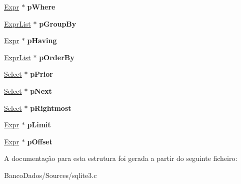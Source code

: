 \begin{DoxyCompactItemize}
\item 
\hypertarget{struct_select_a0562c1e19acde263a04af015611d8ce8}{\hyperlink{struct_expr}{Expr} $\ast$ {\bfseries p\-Where}}\label{struct_select_a0562c1e19acde263a04af015611d8ce8}

\item 
\hypertarget{struct_select_a5b625c7495468ae56ca2f214a76231a0}{\hyperlink{struct_expr_list}{Expr\-List} $\ast$ {\bfseries p\-Group\-By}}\label{struct_select_a5b625c7495468ae56ca2f214a76231a0}

\item 
\hypertarget{struct_select_ad09e0b115e6e1599e3075b87dfa6e66e}{\hyperlink{struct_expr}{Expr} $\ast$ {\bfseries p\-Having}}\label{struct_select_ad09e0b115e6e1599e3075b87dfa6e66e}

\item 
\hypertarget{struct_select_a73c474cd4a9a9b9aa4e3187d8bf2d886}{\hyperlink{struct_expr_list}{Expr\-List} $\ast$ {\bfseries p\-Order\-By}}\label{struct_select_a73c474cd4a9a9b9aa4e3187d8bf2d886}

\item 
\hypertarget{struct_select_a51d1a253b0aba5a54b11b3bf3896d056}{\hyperlink{struct_select}{Select} $\ast$ {\bfseries p\-Prior}}\label{struct_select_a51d1a253b0aba5a54b11b3bf3896d056}

\item 
\hypertarget{struct_select_a96aa0caf60390b8f5e88589639205c40}{\hyperlink{struct_select}{Select} $\ast$ {\bfseries p\-Next}}\label{struct_select_a96aa0caf60390b8f5e88589639205c40}

\item 
\hypertarget{struct_select_a6ee045fa4305f1d68be5bdc22555e624}{\hyperlink{struct_select}{Select} $\ast$ {\bfseries p\-Rightmost}}\label{struct_select_a6ee045fa4305f1d68be5bdc22555e624}

\item 
\hypertarget{struct_select_a11d3b48d04d58be818cdefb10aa061a0}{\hyperlink{struct_expr}{Expr} $\ast$ {\bfseries p\-Limit}}\label{struct_select_a11d3b48d04d58be818cdefb10aa061a0}

\item 
\hypertarget{struct_select_aeaf016a10203b911000354122562fb46}{\hyperlink{struct_expr}{Expr} $\ast$ {\bfseries p\-Offset}}\label{struct_select_aeaf016a10203b911000354122562fb46}

\end{DoxyCompactItemize}


A documentação para esta estrutura foi gerada a partir do seguinte ficheiro\-:\begin{DoxyCompactItemize}
\item 
Banco\-Dados/\-Sources/sqlite3.\-c\end{DoxyCompactItemize}

